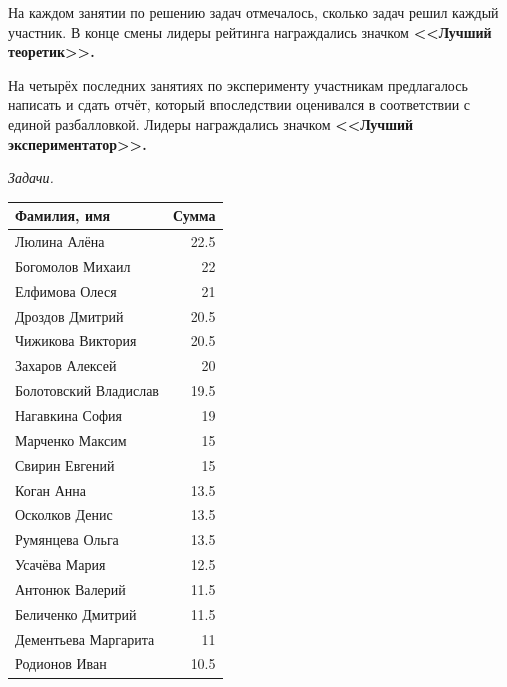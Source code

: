 \documentclass[12pt]{article}
\newlength{\h}
\newlength{\x}
\begin{document}
На каждом занятии по решению задач отмечалось, сколько задач решил
каждый участник. В конце смены лидеры рейтинга награждались значком
\textbf{<<Лучший теоретик>>.}

На четырёх последних занятиях по эксперименту участникам предлагалось
написать и сдать отчёт, который впоследствии оценивался в соответствии
с единой разбалловкой. Лидеры награждались значком \textbf{<<Лучший
  экспериментатор>>.}

\begin{table}[ht]
  \begin{minipage}[t]{0.48\linewidth}\centering
    \begin{center}
      \textit{Задачи.}
    \end{center}
    \begin{tabular}{|l|r|}
      \hline
      Фамилия, имя           &  Сумма  \\
      \hline
      Люлина Алёна           &   22.5  \\
      \hline
      Богомолов Михаил       &     22  \\
      \hline
      Елфимова Олеся         &     21  \\
      \hline
      Дроздов Дмитрий        &   20.5  \\
      \hline
      Чижикова Виктория      &   20.5  \\
      \hline
      Захаров Алексей        &     20  \\
      \hline
      Болотовский Владислав  &   19.5  \\
      \hline
      Нагавкина София        &     19  \\
      \hline
      Марченко Максим        &     15  \\
      \hline
      Свирин Евгений         &    15  \\
      \hline
      Коган Анна             &   13.5  \\
      \hline
      Осколков Денис         &   13.5  \\
      \hline
      Румянцева Ольга        &   13.5  \\
      \hline
      Усачёва Мария          &   12.5  \\
      \hline
      Антонюк Валерий        &   11.5  \\
      \hline
      Беличенко Дмитрий      &   11.5  \\
      \hline
      Дементьева Маргарита   &     11  \\
      \hline
      Родионов Иван          &   10.5  \\

\end{tabular}
\end{minipage}
\end{table}
\end{document}
